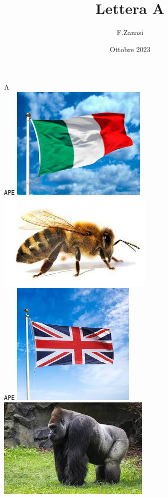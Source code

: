 \documentclass{article}
\title{Lettera A}
\author{F.Zanasi}
\date{Ottobre 2023}
\begin{document}
{\fontsize{200}{210}\selectfont A} 
\\[1cm]
{\fontsize{100}{100}\color{blue}\texttt{A}\color{black}\texttt{PE}} 
\includegraphics[scale=0.5]{flag-IT1}
\includegraphics[scale=0.5]{ape}
\\[3cm]
{\fontsize{100}{110}\color{blue}\texttt{A}\color{black}\texttt{PE}} 
\includegraphics[scale=0.5]{flag-UK}
\includegraphics[scale=0.5]{gorilla}
\end{document}
